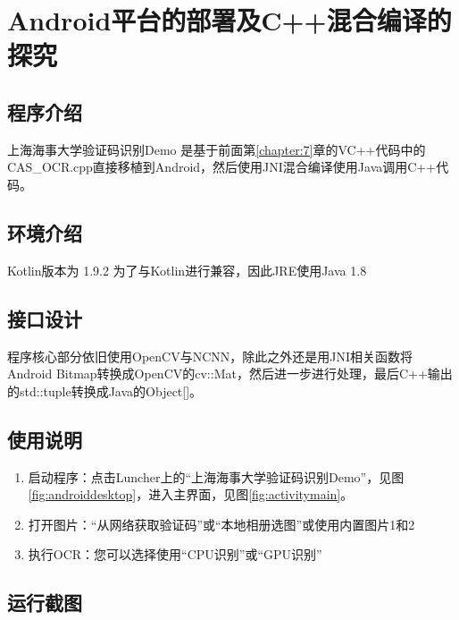 \newpage
\chapter{Android平台的部署及C++混合编译的探究}
\label{chapter:10}

\section{程序介绍}

上海海事大学验证码识别Demo 是基于前面第\ref{chapter:7}章的VC++代码中的CAS\_OCR.cpp直接移植到Android，然后使用JNI混合编译使用Java调用C++代码。

\section{环境介绍}

Kotlin版本为 1.9.2
为了与Kotlin进行兼容，因此JRE使用Java 1.8

\section{接口设计}

程序核心部分依旧使用OpenCV与NCNN，除此之外还是用JNI相关函数将Android Bitmap转换成OpenCV的cv::Mat，然后进一步进行处理，最后C++输出的std::tuple转换成Java的Object[]。

\section{使用说明}

\begin{enumerate}
	\item 启动程序：点击Luncher上的“上海海事大学验证码识别Demo”，见图\ref{fig:androiddesktop}，进入主界面，见图\ref{fig:activitymain}。
	\item 打开图片：“从网络获取验证码”或“本地相册选图”或使用内置图片1和2
	\item 执行OCR：您可以选择使用“CPU识别”或“GPU识别”
\end{enumerate}

\section{运行截图}

